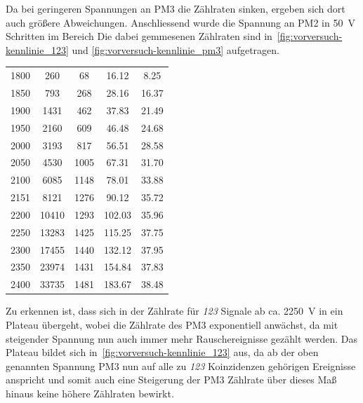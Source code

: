 \documentclass[slug=LM, room=Andreas-Schubert-Bau\,\ K\ 1A, supervisor=Anne-Sophie\ Berthold, coursedate=13.\ 12.\ 2019]{../../Lab_Report_LaTeX/lab_report}
\begin{document}
Da bei geringeren Spannungen an PM3 die Z\"ahlraten sinken, ergeben
sich dort auch gr\"o\ss{}ere Abweichungen.  Anschliessend wurde die
Spannung an PM2 in \SI{50}{\volt} Schritten im Bereich
Die dabei gemmesenen Z\"ahlraten
sind in~\ref{fig:vorversuch-kennlinie_123} und
\ref{fig:vorversuch-kennlinie_pm3} aufgetragen.

%  

%  

\begin{table}[h]
	\begin{tabular}{SSSSS}
		1800 & 260   & 68   & 16.12  & 8.25  \\
		1850 & 793   & 268  & 28.16  & 16.37 \\
		1900 & 1431  & 462  & 37.83  & 21.49 \\
		1950 & 2160  & 609  & 46.48  & 24.68 \\
		2000 & 3193  & 817  & 56.51  & 28.58 \\
		2050 & 4530  & 1005 & 67.31  & 31.70 \\
		2100 & 6085  & 1148 & 78.01  & 33.88 \\
		2151 & 8121  & 1276 & 90.12  & 35.72 \\
		2200 & 10410 & 1293 & 102.03 & 35.96 \\
		2250 & 13283 & 1425 & 115.25 & 37.75 \\
		2300 & 17455 & 1440 & 132.12 & 37.95 \\
		2350 & 23974 & 1431 & 154.84 & 37.83 \\
		2400 & 33735 & 1481 & 183.67 & 38.48
	\end{tabular}
\end{table}

Zu erkennen ist, dass sich in der Z\"ahlrate f\"ur \textit{123}
Signale ab ca. \SI{2250}{\volt} in ein Plateau \"ubergeht, wobei die
Z\"ahlrate des PM3 exponentiell anw\"achst, da mit steigender Spannung
nun auch immer mehr Rauschereignisse gez\"ahlt werden. Das Plateau
bildet sich in~\ref{fig:vorversuch-kennlinie_123} aus, da ab der oben
genannten Spannung PM3 nun auf alle zu \textit{123} Koinzidenzen
geh\"origen Ereignisse anspricht und somit auch eine Steigerung der
PM3 Z\"ahlrate \"uber dieses Ma\ss{} hinaus keine h\"ohere Z\"ahlraten
bewirkt.
\end{document}
